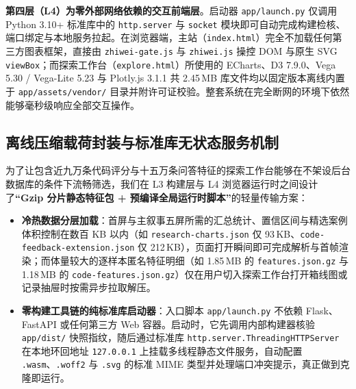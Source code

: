 \medskip

\textbf{第四层（L4）为零外部网络依赖的交互前端层}。启动器 \texttt{app/launch.py} 仅调用 Python 3.10+ 标准库中的 \texttt{http.server} 与 \texttt{socket} 模块即可自动完成构建检核、端口绑定与本地服务拉起。在浏览器端，主站（\texttt{index.html}）完全不加载任何第三方图表框架，直接由 \texttt{zhiwei-gate.js} 与 \texttt{zhiwei.js} 操控 DOM 与原生 SVG \texttt{viewBox}；而探索工作台（\texttt{explore.html}）所使用的 ECharts、D3 7.9.0、Vega 5.30 / Vega-Lite 5.23 与 Plotly.js 3.1.1 共 2.45\,MB 库文件均以固定版本离线内置于 \texttt{app/assets/vendor/} 目录并附许可证校验。整套系统在完全断网的环境下依然能够毫秒级响应全部交互操作。

\subsection{离线压缩载荷封装与标准库无状态服务机制}

为了让包含近九万条代码评分与十五万条问答特征的探索工作台能够在不架设后台数据库的条件下流畅筛选，我们在 L3 构建层与 L4 浏览器运行时之间设计了\textbf{“Gzip 分片静态特征包 + 预编译全局运行时脚本”}的轻量传输方案：

\begin{itemize}
  \item \textbf{冷热数据分层加载}：首屏与主叙事五屏所需的汇总统计、置信区间与精选案例体积控制在数百 KB 以内（如 \texttt{research-charts.json} 仅 93\,KB、\texttt{code-feedback-extension.json} 仅 212\,KB），页面打开瞬间即可完成解析与首帧渲染；而体量较大的逐样本匿名特征明细（如 1.85\,MB 的 \texttt{features.json.gz} 与 1.18\,MB 的 \texttt{code-features.json.gz}）仅在用户切入探索工作台打开箱线图或记录抽屉时按需异步拉取解压。
  \item \textbf{零构建工具链的纯标准库启动器}：入口脚本 \texttt{app/launch.py} 不依赖 Flask、FastAPI 或任何第三方 Web 容器。启动时，它先调用内部构建器核验 \texttt{app/dist/} 快照指纹，随后通过标准库 \texttt{http.server.ThreadingHTTPServer} 在本地环回地址 \texttt{127.0.0.1} 上挂载多线程静态文件服务，自动配置 \texttt{.wasm}、\texttt{.woff2} 与 \texttt{.svg} 的标准 MIME 类型并处理端口冲突提示，真正做到克隆即运行。
\end{itemize}
